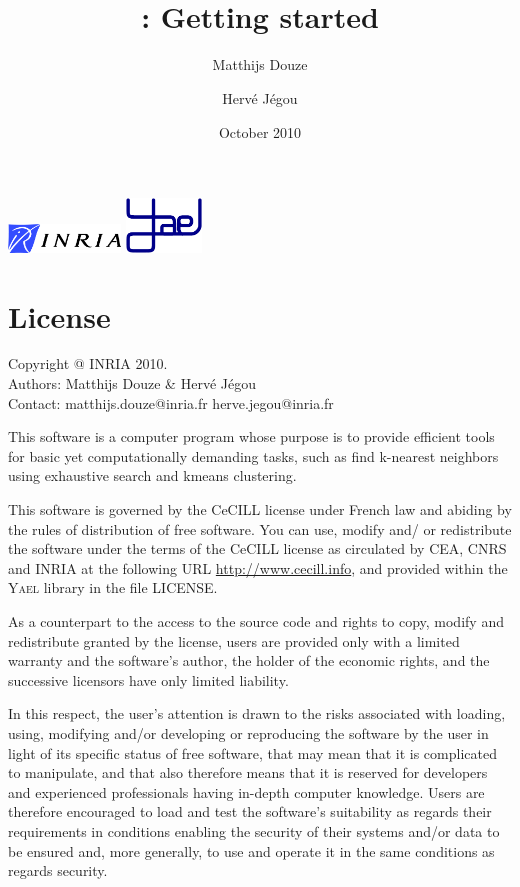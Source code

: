\documentclass[a4paper,11pt,notitlepage,final,twoside]{report}
\title{~\vspace{9cm} \\ \yael: Getting started}
\author{Matthijs Douze \and Herv\'e J\'egou}
\date{October 2010}
\newcommand{\yael}{\textsc{Yael}\xspace}
\begin{document}
\maketitle
\thispagestyle{empty}

\vfill

\includegraphics[width=3cm]{./figs/logoinria} \hfill \includegraphics[width=2cm]{./figs/logoyael} 


\newpage

\chapter*{License}

\thispagestyle{empty}

Copyright @ INRIA 2010. \\
Authors: Matthijs Douze \& Herv\'e J\'egou \\
Contact: matthijs.douze@inria.fr  herve.jegou@inria.fr \\
\medskip

This software is a computer program whose purpose is to provide 
efficient tools for basic yet computationally demanding tasks, 
such as find k-nearest neighbors using exhaustive search 
and kmeans clustering. 
\medskip

This software is governed by the CeCILL license under French law and
abiding by the rules of distribution of free software.  You can  use, 
modify and/ or redistribute the software under the terms of the CeCILL
license as circulated by CEA, CNRS and INRIA at the following URL
\url{http://www.cecill.info}, and provided within the \yael library 
in the file LICENSE. 
\medskip

As a counterpart to the access to the source code and  rights to copy,
modify and redistribute granted by the license, users are provided only
with a limited warranty  and the software's author,  the holder of the
economic rights,  and the successive licensors  have only  limited
liability. 
\medskip

In this respect, the user's attention is drawn to the risks associated
with loading,  using,  modifying and/or developing or reproducing the
software by the user in light of its specific status of free software,
that may mean  that it is complicated to manipulate,  and  that  also
therefore means  that it is reserved for developers  and  experienced
professionals having in-depth computer knowledge. Users are therefore
encouraged to load and test the software's suitability as regards their
requirements in conditions enabling the security of their systems and/or 
data to be ensured and,  more generally, to use and operate it in the 
same conditions as regards security. 
\medskip
\end{document}
